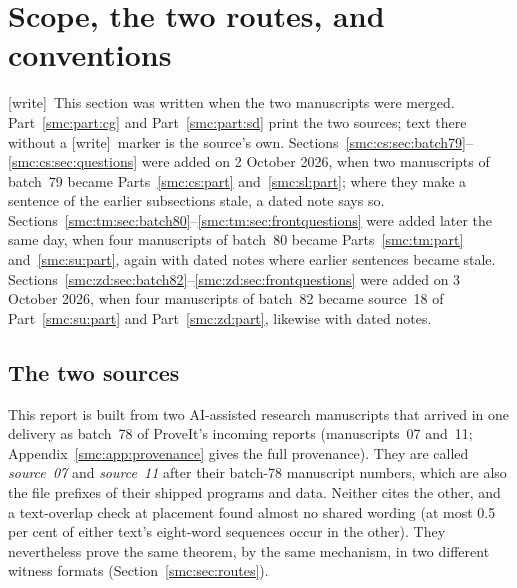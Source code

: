 \documentclass[11pt,letterpaper]{article}
\numberwithin{equation}{section}
\theoremstyle{definition}
\theoremstyle{remark}
\newcommand{\wtag}{\textup{[write]}}
\begin{document}
\tableofcontents
\newpage
\section{Scope, the two routes, and conventions}\label{smc:sec:front}

\wtag\ This section was written when the two manuscripts were merged. Part~\ref{smc:part:cg} and Part~\ref{smc:part:sd} print the two sources; text there without a \wtag\ marker is the source's own. Sections~\ref{smc:cs:sec:batch79}--\ref{smc:cs:sec:questions} were added on 2 October 2026, when two manuscripts of batch~79 became Parts~\ref{smc:cs:part} and~\ref{smc:sl:part}; where they make a sentence of the earlier subsections stale, a dated note says so. Sections~\ref{smc:tm:sec:batch80}--\ref{smc:tm:sec:frontquestions} were added later the same day, when four manuscripts of batch~80 became Parts~\ref{smc:tm:part} and~\ref{smc:su:part}, again with dated notes where earlier sentences became stale. Sections~\ref{smc:zd:sec:batch82}--\ref{smc:zd:sec:frontquestions} were added on 3 October 2026, when four manuscripts of batch~82 became source~18 of Part~\ref{smc:su:part} and Part~\ref{smc:zd:part}, likewise with dated notes.

\subsection{The two sources}\label{smc:sec:parts}

This report is built from two AI-assisted research manuscripts that arrived in one delivery as batch~78 of ProveIt's incoming reports (manuscripts~07 and~11; Appendix~\ref{smc:app:provenance} gives the full provenance). They are called \emph{source~07} and \emph{source~11} after their batch-78 manuscript numbers, which are also the file prefixes of their shipped programs and data. Neither cites the other, and a text-overlap check at placement found almost no shared wording (at most 0.5 per cent of either text's eight-word sequences occur in the other). They nevertheless prove the same theorem, by the same mechanism, in two different witness formats (Section~\ref{smc:sec:routes}).
\end{document}
